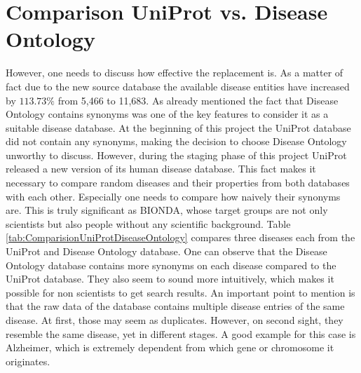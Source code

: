 \section{Comparison UniProt vs. Disease Ontology}
However, one needs to discuss how effective the replacement is. As a matter of fact due to the new source database the available disease entities have increased by $113.73\%$ from 5,466 to 11,683. As already mentioned the fact that Disease Ontology contains synonyms was one of the key features to consider it as a suitable disease database. At the beginning of this project the \ac{UniProt} database did not contain any synonyms, making the decision to choose Disease Ontology unworthy to discuss. However, during the staging phase of this project \ac{UniProt} released a new version of its human disease database. This fact makes it necessary to compare random diseases and their properties from both databases with each other. Especially one needs to compare how naively their synonyms are. This is truly significant as BIONDA, whose target groups are not only scientists but also people without any scientific background. Table \ref{tab:ComparisionUniProtDiseaseOntology} compares three diseases each from the \ac{UniProt} and Disease Ontology database. One can observe that the Disease Ontology database contains more synonyms on each disease compared to the \ac{UniProt} database. They also seem to sound more intuitively, which makes it possible for non scientists to get search results.  An important point to mention is that the raw data of the database contains multiple disease entries of the same disease. At first, those may seem as duplicates. However, on second sight, they resemble the same disease, yet in different stages. A good example for this case is Alzheimer, which is extremely dependent from which gene or chromosome it originates.\\

